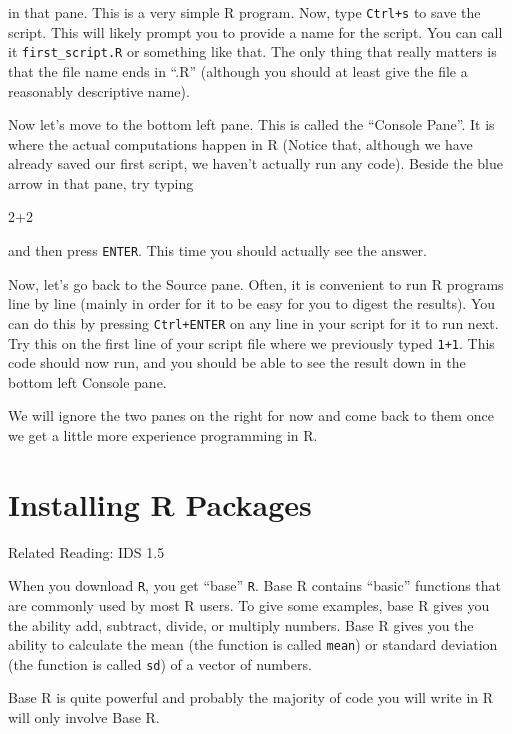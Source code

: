 \documentclass[
  letterpaper,
  DIV=11,
  numbers=noendperiod]{scrreprt}
\newenvironment{Shaded}{\begin{snugshade}}{\end{snugshade}}
\newcommand{\DecValTok}[1]{\textcolor[rgb]{0.68,0.00,0.00}{#1}}
\newcommand{\SpecialCharTok}[1]{\textcolor[rgb]{0.37,0.37,0.37}{#1}}
\begin{document}
in that pane. This is a very simple R program. Now, type \texttt{Ctrl+s}
to save the script. This will likely prompt you to provide a name for
the script. You can call it \texttt{first\_script.R} or something like
that. The only thing that really matters is that the file name ends in
``.R'' (although you should at least give the file a reasonably
descriptive name).

Now let's move to the bottom left pane. This is called the ``Console
Pane''. It is where the actual computations happen in R (Notice that,
although we have already saved our first script, we haven't actually run
any code). Beside the blue arrow in that pane, try typing

\begin{Shaded}
\begin{Highlighting}[]
\DecValTok{2}\SpecialCharTok{+}\DecValTok{2}
\end{Highlighting}
\end{Shaded}

and then press \texttt{ENTER}. This time you should actually see the
answer.

Now, let's go back to the Source pane. Often, it is convenient to run R
programs line by line (mainly in order for it to be easy for you to
digest the results). You can do this by pressing \texttt{Ctrl+ENTER} on
any line in your script for it to run next. Try this on the first line
of your script file where we previously typed \texttt{1+1}. This code
should now run, and you should be able to see the result down in the
bottom left Console pane.

We will ignore the two panes on the right for now and come back to them
once we get a little more experience programming in R.

\section{Installing R Packages}\label{installing-r-packages}

Related Reading: IDS 1.5

When you download \texttt{R}, you get ``base'' \texttt{R}. Base R
contains ``basic'' functions that are commonly used by most R users. To
give some examples, base R gives you the ability add, subtract, divide,
or multiply numbers. Base R gives you the ability to calculate the mean
(the function is called \texttt{mean}) or standard deviation (the
function is called \texttt{sd}) of a vector of numbers.

Base R is quite powerful and probably the majority of code you will
write in R will only involve Base R.
\end{document}
